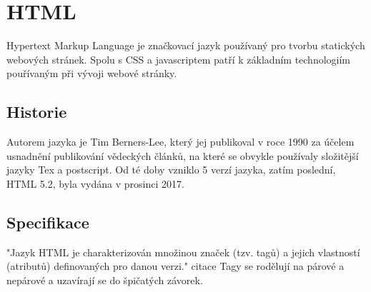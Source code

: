 \documentclass[main.tex]{subfiles}
\begin{document}
\section{HTML}
Hypertext Markup Language je značkovací jazyk používaný pro tvorbu statických webových stránek. Spolu s CSS a javascriptem patří k základním technologiím pouřívaným při vývoji webové stránky. 
\subsection{Historie}
Autorem jazyka je Tim Berners-Lee, který jej publikoval v roce 1990 za účelem usnadnění publikování vědeckých článků, na které se obvykle používaly složitější jazyky Tex a postscript. Od té doby vzniklo 5 verzí jazyka, zatím poslední, HTML 5.2, byla vydána v prosinci 2017.

\subsection{Specifikace}
"Jazyk HTML je charakterizován množinou značek (tzv. tagů) a jejich vlastností (atributů) definovaných pro danou verzi." citace Tagy se rodělují na párové a nepárové a uzavírají se do špičatých závorek.
\end{document}

